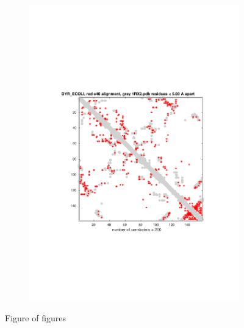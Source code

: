 \documentclass[11pt]{article}\usepackage[]{graphicx}\usepackage[]{color}
\theoremstyle{plain}
\begin{document}
\begin{multicols*}{2}
\begin{figure}[p]
\begin{subfigure}[b]{.5\textwidth}
      \includegraphics[width=\textwidth, trim=2cm 7cm 2cm 7cm, clip]{../figures/DYR_ECOLI_e3_n2_m40_Cmap_200}
      \caption{ }
      \label{fig:fig4}
    \end{subfigure}%
    \caption{Figure of figures}
    \label{fig:init_figures}
  \end{figure}




\end{multicols*}
\end{document}
